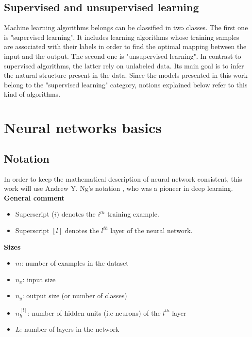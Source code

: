 \subsection{Supervised and unsupervised learning}

\setlength{\marginparwidth}{3cm}\leavevmode {}Machine learning algorithms belongs can be classified in two classes. The first one is "supervised learning". It includes learning algorithms whose training samples are associated with their labels in order to find the optimal mapping between the input and the output. The second one is "unsupervised learning". In contrast to supervised algorithms, the latter rely on unlabeled data. Its main goal is to infer the natural structure  present in the data. Since the models presented in this work belong to the "supervised learning" category, notions explained below refer to this kind of algorithms.


\section{Neural networks basics}

\subsection{Notation}

\setlength{\marginparwidth}{3cm}\leavevmode {}In order to keep the mathematical description of neural network consistent, this work will use Andrew Y. Ng's notation \cite{16}, who was a pioneer in deep learning.\\

\noindent \textbf{General comment}
\begin{itemize}
\item Superscript ($i)$ denotes the $i^{th}$ training example.
\item Superscript $[l]$ denotes the $l^{th}$ layer of the neural network.
\end{itemize}

\noindent \textbf{Sizes}
\begin{itemize}
\item $m$: number of examples in the dataset
\item $n_{x}$: input size
\item $n_{y}$: output size (or number of classes)
\item $n_{h}^{[l]}$: number of hidden units (i.e neurons) of the $l^{th}$ layer
\item $L$: number of layers in the network
\end{itemize}

